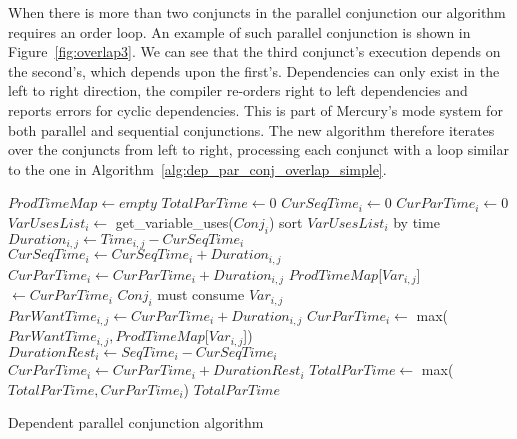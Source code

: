 
When there is more than two conjuncts in the parallel conjunction our
algorithm requires an order loop.
An example of such parallel conjunction is shown in Figure~\ref{fig:overlap3}.
We can see that the third conjunct's execution depends on the second's,
which depends upon the first's.
Dependencies can only exist in the left to right direction,
the compiler re-orders right to left dependencies and reports errors for
cyclic dependencies.
This is part of Mercury's mode system for both parallel and sequential
conjunctions.
The new algorithm therefore iterates over the conjuncts from left to right,
processing each conjunct with a loop similar to the one in
Algorithm~\ref{alg:dep_par_conj_overlap_simple}.

\begin{algorithm}[tbp]
\begin{algorithmic}[5]
    \State $ProdTimeMap \gets empty$
    \State $TotalParTime \gets 0$
        \State $CurSeqTime_i \gets 0$
        \State $CurParTime_i \gets 0$
        \State $VarUsesList_i \gets$ get\_variable\_uses($Conj_i$)
        \State sort $VarUsesList_i$ by time
            \State $Duration_{i, j} \gets Time_{i, j} - CurSeqTime_i$
            \State $CurSeqTime_i \gets CurSeqTime_i + Duration_{i, j}$
                \State $CurParTime_i \gets CurParTime_i + Duration_{i, j}$
                \State $ProdTimeMap$[$Var_{i, j}$]~$ \gets CurParTime_i$
            \Else
                \Comment $Conj_i$ must consume $Var_{i, j}$
                \State $ParWantTime_{i, j} \gets CurParTime_i + Duration_{i, j}$
                \State $CurParTime_i \gets$
                    max($ParWantTime_{i, j}, ProdTimeMap$[$Var_{i, j}$])
            \EndIf
        \EndFor
        \State $DurationRest_i \gets SeqTime_i - CurSeqTime_i$
        \State $CurParTime_i \gets CurParTime_i + DurationRest_i$
        \State $TotalParTime \gets$ max($TotalParTime, CurParTime_i$)
    \EndFor
    \State \Return $TotalParTime$
\EndProcedure
\end{algorithmic}
\caption{Dependent parallel conjunction algorithm}
\label{alg:dep_par_conj_overlap_middle}
\end{algorithm}

